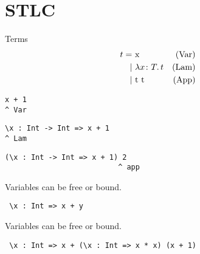 \documentclass{beamer}
\begin{document}
\section{STLC}

\begin{frame}[c]
  Terms
  \begin{displaymath}
    \begin{aligned}
t =& \ \text{x} & \text{(Var)}\\
  |& \ \lambda x \colon T \ldotp t & \text{(Lam)}\\
  |& \ \text{t t} & \text{(App)}
    \end{aligned}
  \end{displaymath}
\end{frame}

\begin{frame}[fragile]
  \begin{verbatim}
x + 1
^ Var
  \end{verbatim}  
\end{frame}

\begin{frame}[fragile]
  \begin{verbatim}
\x : Int -> Int => x + 1
^ Lam
  \end{verbatim}  
\end{frame}

\begin{frame}[fragile]
  \begin{verbatim}
(\x : Int -> Int => x + 1) 2
                          ^ app
  \end{verbatim}  
\end{frame}

\begin{frame}[fragile]
  \begin{center}
   Variables can be free or bound.
  \end{center}
  \begin{verbatim}
 \x : Int => x + y
  \end{verbatim}  
\end{frame}

\begin{frame}[fragile]
  \begin{center}
   Variables can be free or bound.
  \end{center}
  \begin{verbatim}
 \x : Int => x + (\x : Int => x * x) (x + 1)
  \end{verbatim}  
\end{frame}
\end{document}
